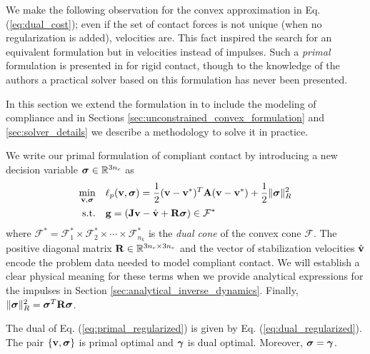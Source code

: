 We make the following observation for the convex approximation in Eq.
(\ref{eq:dual_cost}); even if the set of contact forces is not unique (when no
regularization is added), velocities are. This fact inspired the search
for an equivalent formulation but in velocities instead of impulses. Such a
\textit{primal} formulation is presented in \cite{bib:mazhar2014} for rigid
contact, though to the knowledge of the authors a practical solver based on this
formulation has never been presented.

In this section we extend the formulation in \cite{bib:mazhar2014} to include
the modeling of compliance and in Sections
\ref{sec:unconstrained_convex_formulation} and \ref{sec:solver_details} we
describe a methodology to solve it in practice.



We write our primal formulation of compliant contact by introducing a new
decision variable ${\bm{\sigma}}\in\mathbb{R}^{3n_c}$ as
\begin{equation}
	\begin{aligned}
	\min_{\mf{v},\bsigma} \quad & \ell_p(\mf{v},\bsigma) = \frac{1}{2}(\mf{v}-\mf{v}^*)^T\mf{A}(\mf{v}-\mf{v}^*) + \frac{1}{2} \Vert\bsigma\Vert_{R}^2\\
	\textrm{s.t.} \quad & \mf{g} = (\mf{J}\mf{v}-\hat{\mf{v}} + \mf{R}\bsigma) \in \mathcal{F}^*\\
	\end{aligned}
	\label{eq:primal_regularized}
\end{equation}
where $\mathcal{F^*}= \mathcal{F}^*_1 \times \mathcal{F}^*_2 \times \cdots \times \mathcal{F}^*_{n_k}$ is the \emph{dual cone} of the convex
cone $\mathcal{F}$. The positive diagonal matrix ${\mathbf{R}}\in\mathbb{R}^{3n_c\times
3n_c}$ and the vector of stabilization velocities $\hat{{\mathbf{v}}}$ encode the
problem data needed to model compliant contact. We will establish a clear
physical meaning for these terms when we provide analytical expressions for the
impulses in Section \ref{sec:analytical_inverse_dynamics}. Finally,
$\Vert{\bm\sigma}\Vert_R^2={\bm\sigma}^T{\mathbf{R}}{\bm\sigma}$.

\begin{theorem}
The dual of Eq. (\ref{eq:primal_regularized}) is given by Eq.
(\ref{eq:dual_regularized}). The pair $\{{\mathbf{v}},{\bm\sigma}\}$ is primal optimal and
${\bm\gamma}$ is dual optimal. Moreover, ${\bm\sigma} = {\bm\gamma}$.
\end{theorem}

